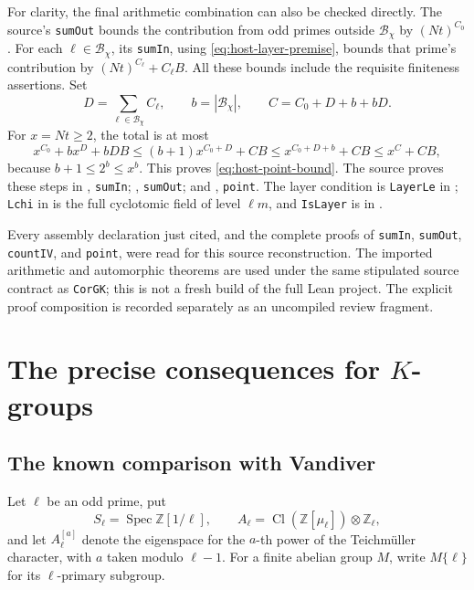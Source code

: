 \documentclass[11pt,a4paper]{article}
\theoremstyle{definition}
\begin{document}
For clarity, the final arithmetic combination can also be checked
directly.  The source's \texttt{sumOut} bounds the contribution from
odd primes outside \(\mathcal B_\chi\) by \((Nt)^{C_0}\).
For each \(\ell\in\mathcal B_\chi\), its \texttt{sumIn}, using
\eqref{eq:host-layer-premise}, bounds that prime's contribution by
\((Nt)^{C_\ell}+C_\ell B\).  All these bounds include the requisite
finiteness assertions.  Set
\[
 D=\sum_{\ell\in\mathcal B_\chi}C_\ell,
 \qquad b=|\mathcal B_\chi|,
 \qquad C=C_0+D+b+bD.
\]
For \(x=Nt\ge2\), the total is at most
\[
 x^{C_0}+b x^D+bDB
 \le (b+1)x^{C_0+D}+CB
 \le x^{C_0+D+b}+CB
 \le x^C+CB,
\]
because \(b+1\le2^b\le x^b\).  This proves
\eqref{eq:host-point-bound}.  The source proves these steps in
, \texttt{sumIn};
, \texttt{sumOut}; and
, \texttt{point}.
The layer condition is \texttt{LayerLe} in
;
\texttt{Lchi} in 
is the full cyclotomic field of level \(\ell m\), and
\texttt{IsLayer} is in .

Every assembly declaration just cited, and the complete proofs of
\texttt{sumIn}, \texttt{sumOut}, \texttt{countIV}, and \texttt{point},
were read for this source reconstruction.  The imported arithmetic
and automorphic theorems are used under the same stipulated source
contract as \texttt{CorGK}; this is not a fresh build of the full
Lean project.  The explicit proof composition is recorded separately
as an uncompiled review fragment.


\section{The precise consequences for \texorpdfstring{$K$}{K}-groups}
\label{sec:k-groups}

\subsection{The known comparison with Vandiver}

Let \(\ell\) be an odd prime, put
\[
 S_\ell=\operatorname{Spec}\mathbb Z[1/\ell],\qquad
 A_\ell=\operatorname{Cl}(\mathbb Z[\mu_\ell])\otimes\mathbb Z_\ell,
\]
and let \(A_\ell^{[a]}\) denote the eigenspace for the \(a\)-th power
of the Teichm\"uller character, with \(a\) taken modulo \(\ell-1\).
For a finite abelian group \(M\), write \(M\{\ell\}\) for its
\(\ell\)-primary subgroup.
\end{document}
